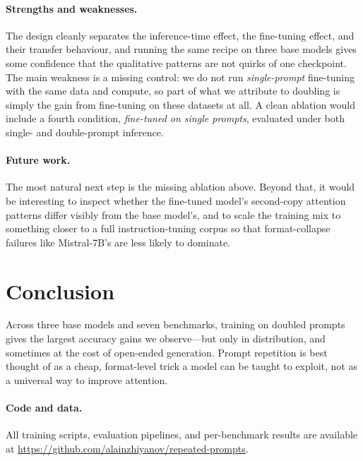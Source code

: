 \documentclass{article}
\begin{document}
\paragraph{Strengths and weaknesses.}
The design cleanly separates the inference-time effect, the fine-tuning
effect, and their transfer behaviour, and running the same recipe on
three base models gives some confidence that the qualitative patterns
are not quirks of one checkpoint. The main weakness is a missing
control: we do not run \emph{single-prompt} fine-tuning with the same
data and compute, so part of what we attribute to doubling is simply
the gain from fine-tuning on these datasets at all. A clean ablation
would include a fourth condition, \emph{fine-tuned on single prompts},
evaluated under both single- and double-prompt inference.

\paragraph{Future work.}
The most natural next step is the missing ablation above. Beyond that,
it would be interesting to inspect whether the fine-tuned model's
second-copy attention patterns differ visibly from the base model's,
and to scale the training mix to something closer to a full
instruction-tuning corpus so that format-collapse failures like
Mistral-7B's are less likely to dominate.


\section{Conclusion}

Across three base models and seven benchmarks, training on doubled
prompts gives the largest accuracy gains we observe---but only in
distribution, and sometimes at the cost of open-ended generation.
Prompt repetition is best thought of as a cheap, format-level trick a
model can be taught to exploit, not as a universal way to improve
attention.


\paragraph{Code and data.}
All training scripts, evaluation pipelines, and per-benchmark results
are available at
\url{https://github.com/alainzhiyanov/repeated-prompts}.


\printbibliography



\appendix
\end{document}
